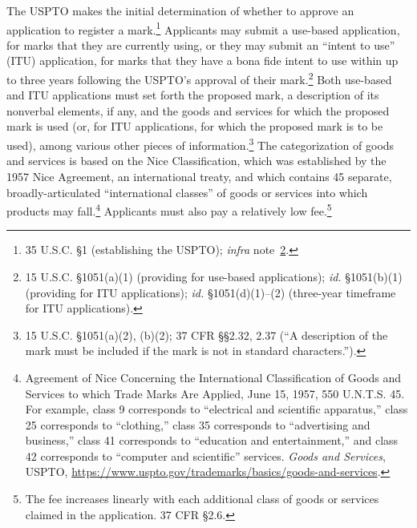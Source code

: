 \documentclass[letterpaper, 11pt, oneside]{article}
\begin{document}
The USPTO makes the initial determination of whether to approve an application to register a mark.\footnote{35 U.S.C. \S 1 (establishing the USPTO); \textit{infra} note~\ref{infra1}.} Applicants may submit a use-based application, for marks that they are currently using, or they may submit an ``intent to use'' (ITU) application, for marks that they have a bona fide intent to use within up to three years following the USPTO's approval of their mark.\footnote{\label{infra1} 15 U.S.C. \S 1051(a)(1) (providing for use-based applications); \textit{id.} \S 1051(b)(1) (providing for ITU applications); \textit{id.} \S 1051(d)(1)–(2) (three-year timeframe for ITU applications).} Both use-based and ITU applications must set forth the proposed mark, a description of its nonverbal elements, if any, and the goods and services for which the proposed mark is used (or, for ITU applications, for which the proposed mark is to be used), among various other pieces of information.\footnote{15 U.S.C. \S 1051(a)(2), (b)(2); 37 CFR \S\S 2.32, 2.37 (``A description of the mark must be included if the mark is not in standard characters.'').} The categorization of goods and services is based on the Nice Classification, which was established by the 1957 Nice Agreement, an international treaty, and which contains 45 separate, broadly-articulated ``international classes'' of goods or services into which products may fall.\footnote{Agreement of Nice Concerning the International Classification of Goods and Services to which Trade Marks Are Applied, June 15, 1957, 550 U.N.T.S. 45. For example, class 9 corresponds to ``electrical and scientific apparatus,'' class 25 corresponds to ``clothing,'' class 35 corresponds to ``advertising and business,'' class 41 corresponds to ``education and entertainment,'' and class 42 corresponds to ``computer and scientific'' services. \textit{Goods and Services}, USPTO, \url{https://www.uspto.gov/trademarks/basics/goods-and-services}.} Applicants must also pay a relatively low fee.\footnote{The fee increases linearly with each additional class of goods or services claimed in the application. 37 CFR \S 2.6.}
\end{document}
